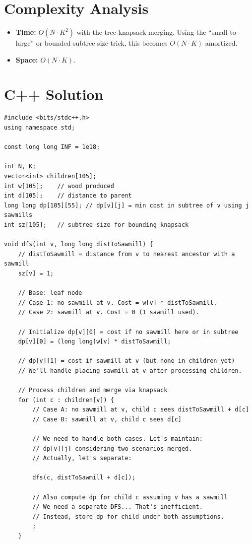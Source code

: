 \documentclass[11pt,a4paper]{article}
\begin{document}
\section{Complexity Analysis}
\begin{itemize}
    \item \textbf{Time:} $O(N \cdot K^2)$ with the tree knapsack merging. Using the ``small-to-large'' or bounded subtree size trick, this becomes $O(N \cdot K)$ amortized.
    \item \textbf{Space:} $O(N \cdot K)$.
\end{itemize}

\section{C++ Solution}

\begin{lstlisting}
#include <bits/stdc++.h>
using namespace std;

const long long INF = 1e18;

int N, K;
vector<int> children[105];
int w[105];    // wood produced
int d[105];    // distance to parent
long long dp[105][55]; // dp[v][j] = min cost in subtree of v using j sawmills
int sz[105];   // subtree size for bounding knapsack

void dfs(int v, long long distToSawmill) {
    // distToSawmill = distance from v to nearest ancestor with a sawmill
    sz[v] = 1;

    // Base: leaf node
    // Case 1: no sawmill at v. Cost = w[v] * distToSawmill.
    // Case 2: sawmill at v. Cost = 0 (1 sawmill used).

    // Initialize dp[v][0] = cost if no sawmill here or in subtree
    dp[v][0] = (long long)w[v] * distToSawmill;

    // dp[v][1] = cost if sawmill at v (but none in children yet)
    // We'll handle placing sawmill at v after processing children.

    // Process children and merge via knapsack
    for (int c : children[v]) {
        // Case A: no sawmill at v, child c sees distToSawmill + d[c]
        // Case B: sawmill at v, child c sees d[c]

        // We need to handle both cases. Let's maintain:
        // dp[v][j] considering two scenarios merged.
        // Actually, let's separate:

        dfs(c, distToSawmill + d[c]);

        // Also compute dp for child c assuming v has a sawmill
        // We need a separate DFS... That's inefficient.
        // Instead, store dp for child under both assumptions.
        ;
    }


\end{lstlisting}
\end{document}
